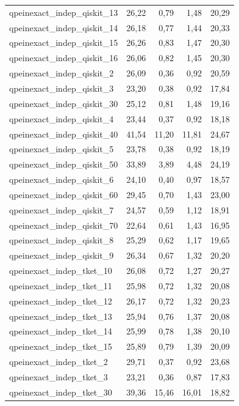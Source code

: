\begin{longtable}{lrrrr}
qpeinexact\_indep\_qiskit\_13 & 26,22 & 0,79 & 1,48 & 20,29 \\
qpeinexact\_indep\_qiskit\_14 & 26,18 & 0,77 & 1,44 & 20,33 \\
qpeinexact\_indep\_qiskit\_15 & 26,26 & 0,83 & 1,47 & 20,30 \\
qpeinexact\_indep\_qiskit\_16 & 26,06 & 0,82 & 1,45 & 20,30 \\
qpeinexact\_indep\_qiskit\_2 & 26,09 & 0,36 & 0,92 & 20,59 \\
qpeinexact\_indep\_qiskit\_3 & 23,20 & 0,38 & 0,92 & 17,84 \\
qpeinexact\_indep\_qiskit\_30 & 25,12 & 0,81 & 1,48 & 19,16 \\
qpeinexact\_indep\_qiskit\_4 & 23,44 & 0,37 & 0,92 & 18,18 \\
qpeinexact\_indep\_qiskit\_40 & 41,54 & 11,20 & 11,81 & 24,67 \\
qpeinexact\_indep\_qiskit\_5 & 23,78 & 0,38 & 0,92 & 18,19 \\
qpeinexact\_indep\_qiskit\_50 & 33,89 & 3,89 & 4,48 & 24,19 \\
qpeinexact\_indep\_qiskit\_6 & 24,10 & 0,40 & 0,97 & 18,57 \\
qpeinexact\_indep\_qiskit\_60 & 29,45 & 0,70 & 1,43 & 23,00 \\
qpeinexact\_indep\_qiskit\_7 & 24,57 & 0,59 & 1,12 & 18,91 \\
qpeinexact\_indep\_qiskit\_70 & 22,64 & 0,61 & 1,43 & 16,95 \\
qpeinexact\_indep\_qiskit\_8 & 25,29 & 0,62 & 1,17 & 19,65 \\
qpeinexact\_indep\_qiskit\_9 & 26,34 & 0,67 & 1,32 & 20,20 \\
qpeinexact\_indep\_tket\_10 & 26,08 & 0,72 & 1,27 & 20,27 \\
qpeinexact\_indep\_tket\_11 & 25,98 & 0,72 & 1,32 & 20,08 \\
qpeinexact\_indep\_tket\_12 & 26,17 & 0,72 & 1,32 & 20,23 \\
qpeinexact\_indep\_tket\_13 & 25,94 & 0,76 & 1,37 & 20,08 \\
qpeinexact\_indep\_tket\_14 & 25,99 & 0,78 & 1,38 & 20,10 \\
qpeinexact\_indep\_tket\_15 & 25,89 & 0,79 & 1,39 & 20,09 \\
qpeinexact\_indep\_tket\_2 & 29,71 & 0,37 & 0,92 & 23,68 \\
qpeinexact\_indep\_tket\_3 & 23,21 & 0,36 & 0,87 & 17,83 \\
qpeinexact\_indep\_tket\_30 & 39,36 & 15,46 & 16,01 & 18,82 \\

\end{longtable}
